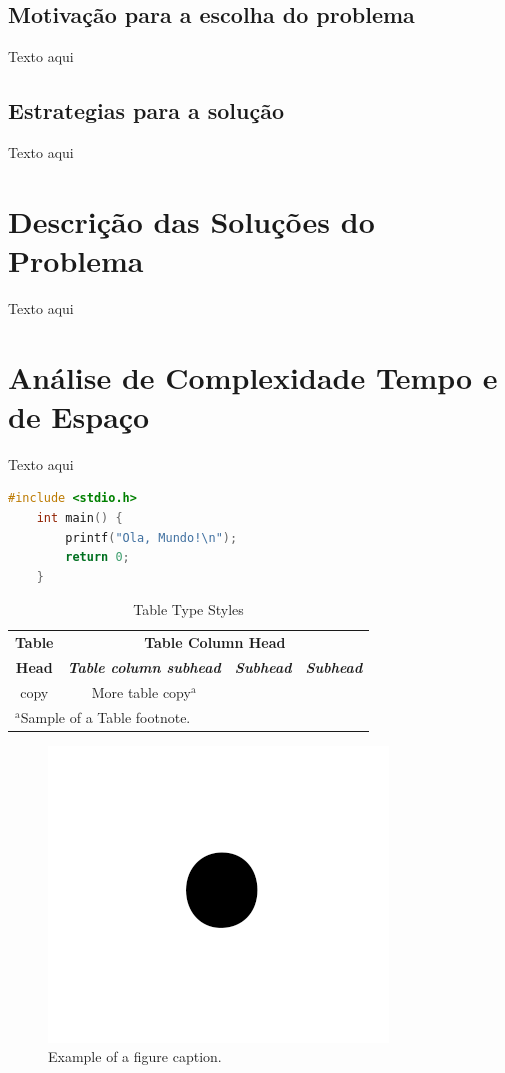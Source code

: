 \documentclass[relatorio]{IEEEtran}
\begin{document}
\subsection{Motivação para a escolha do problema}
Texto aqui

\subsection{Estrategias para a solução}
Texto aqui

\section{Descrição das Soluções do Problema}
Texto aqui
\section{Análise de Complexidade Tempo e de Espaço}
Texto aqui
\begin{lstlisting}[language=C]
    #include <stdio.h>
    int main() {
        printf("Ola, Mundo!\n");
        return 0;
    }
\end{lstlisting}

\begin{table}[htbp]
\caption{Table Type Styles}
\begin{center}
\begin{tabular}{|c|c|c|c|}
\hline
\textbf{Table}&\multicolumn{3}{|c|}{\textbf{Table Column Head}} \\
\cline{2-4} 
\textbf{Head} & \textbf{\textit{Table column subhead}}& \textbf{\textit{Subhead}}& \textbf{\textit{Subhead}} \\
\hline
copy& More table copy$^{\mathrm{a}}$& &  \\
\hline
\multicolumn{4}{l}{$^{\mathrm{a}}$Sample of a Table footnote.}
\end{tabular}
\label{tab1}
\end{center}
\end{table}

\begin{figure}[htbp]
\centerline{\includegraphics{fig1.png}}
\caption{Example of a figure caption.}
\label{fig}
\end{figure}
\end{document}
